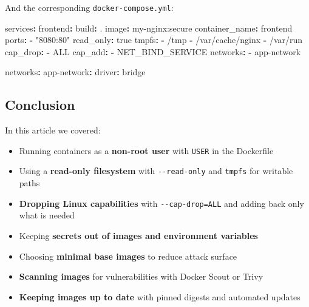 \documentclass[11pt,american,a4paper,openany]{book}
\providecommand{\tightlist}{%
  \setlength{\itemsep}{2pt}\setlength{\parskip}{0pt}}
\newenvironment{Shaded}{}{}
\newcommand{\AttributeTok}[1]{\textcolor[rgb]{0.49,0.56,0.16}{#1}}
\newcommand{\CharTok}[1]{\textcolor[rgb]{0.25,0.44,0.63}{#1}}
\newcommand{\FunctionTok}[1]{\textcolor[rgb]{0.02,0.16,0.49}{#1}}
\newcommand{\KeywordTok}[1]{\textcolor[rgb]{0.00,0.44,0.13}{\textbf{#1}}}
\newcommand{\StringTok}[1]{\textcolor[rgb]{0.25,0.44,0.63}{#1}}
\begin{document}
And the corresponding \texttt{docker-compose.yml}:

\begin{Shaded}
\begin{Highlighting}[]
\FunctionTok{services}\KeywordTok{:}
\AttributeTok{  }\FunctionTok{frontend}\KeywordTok{:}
\AttributeTok{    }\FunctionTok{build}\KeywordTok{:}\AttributeTok{ .}
\AttributeTok{    }\FunctionTok{image}\KeywordTok{:}\AttributeTok{ my{-}nginx:secure}
\AttributeTok{    }\FunctionTok{container\_name}\KeywordTok{:}\AttributeTok{ frontend}
\AttributeTok{    }\FunctionTok{ports}\KeywordTok{:}
\AttributeTok{      }\KeywordTok{{-}}\AttributeTok{ }\StringTok{"8080:80"}
\AttributeTok{    }\FunctionTok{read\_only}\KeywordTok{:}\AttributeTok{ }\CharTok{true}
\AttributeTok{    }\FunctionTok{tmpfs}\KeywordTok{:}
\AttributeTok{      }\KeywordTok{{-}}\AttributeTok{ /tmp}
\AttributeTok{      }\KeywordTok{{-}}\AttributeTok{ /var/cache/nginx}
\AttributeTok{      }\KeywordTok{{-}}\AttributeTok{ /var/run}
\AttributeTok{    }\FunctionTok{cap\_drop}\KeywordTok{:}
\AttributeTok{      }\KeywordTok{{-}}\AttributeTok{ ALL}
\AttributeTok{    }\FunctionTok{cap\_add}\KeywordTok{:}
\AttributeTok{      }\KeywordTok{{-}}\AttributeTok{ NET\_BIND\_SERVICE}
\AttributeTok{    }\FunctionTok{networks}\KeywordTok{:}
\AttributeTok{      }\KeywordTok{{-}}\AttributeTok{ app{-}network}

\FunctionTok{networks}\KeywordTok{:}
\AttributeTok{  }\FunctionTok{app{-}network}\KeywordTok{:}
\AttributeTok{    }\FunctionTok{driver}\KeywordTok{:}\AttributeTok{ bridge}
\end{Highlighting}
\end{Shaded}

\subsection{Conclusion}\label{conclusion-6}

In this article we covered:

\begin{itemize}
\tightlist
\item
  Running containers as a \textbf{non-root user} with \texttt{USER} in
  the Dockerfile
\item
  Using a \textbf{read-only filesystem} with \texttt{-\/-read-only} and
  \texttt{tmpfs} for writable paths
\item
  \textbf{Dropping Linux capabilities} with \texttt{-\/-cap-drop=ALL}
  and adding back only what is needed
\item
  Keeping \textbf{secrets out of images and environment variables}
\item
  Choosing \textbf{minimal base images} to reduce attack surface
\item
  \textbf{Scanning images} for vulnerabilities with Docker Scout or
  Trivy
\item
  \textbf{Keeping images up to date} with pinned digests and automated
  updates
\end{itemize}
\end{document}
